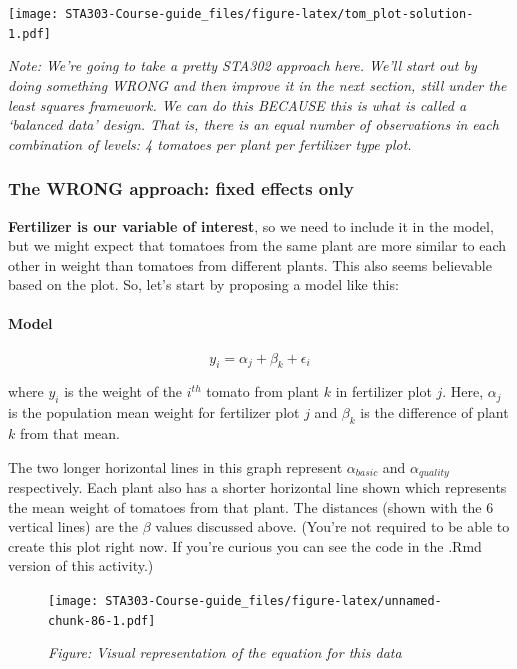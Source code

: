 \documentclass[
  openany]{book}
\begin{document}
\texttt{[image: STA303-Course-guide\_files/figure-latex/tom\_plot-solution-1.pdf]}

\emph{Note: We're going to take a pretty STA302 approach here. We'll start out by doing something WRONG and then improve it in the next section, still under the least squares framework. We can do this BECAUSE this is what is called a `balanced data' design. That is, there is an equal number of observations in each combination of levels: 4 tomatoes per plant per fertilizer type plot.}

\hypertarget{the-wrong-approach-fixed-effects-only}{%
\subsubsection{The WRONG approach: fixed effects only}\label{the-wrong-approach-fixed-effects-only}}

\textbf{Fertilizer is our variable of interest}, so we need to include it in the model, but we might expect that tomatoes from the same plant are more similar to each other in weight than tomatoes from different plants. This also seems believable based on the plot. So, let's start by proposing a model like this:

\hypertarget{model}{%
\paragraph{Model}\label{model}}

\[y_{i} = \alpha_j + \beta_k + \epsilon_{i}  \]

where \(y_{i}\) is the weight of the \(i^{th}\) tomato from plant \(k\) in fertilizer plot \(j\). Here, \(\alpha_j\) is the population mean weight for fertilizer plot \(j\) and \(\beta_k\) is the difference of plant \(k\) from that mean.

The two longer horizontal lines in this graph represent \(\alpha_{basic}\) and \(\alpha_{quality}\) respectively. Each plant also has a shorter horizontal line shown which represents the mean weight of tomatoes from that plant. The distances (shown with the 6 vertical lines) are the \(\beta\) values discussed above. (You're not required to be able to create this plot right now. If you're curious you can see the code in the .Rmd version of this activity.)

\begin{figure}
\centering
\texttt{[image: STA303-Course-guide\_files/figure-latex/unnamed-chunk-86-1.pdf]}
\caption{\label{fig:unnamed-chunk-86}\emph{Figure: Visual representation of the equation for this data}}
\end{figure}
\end{document}
